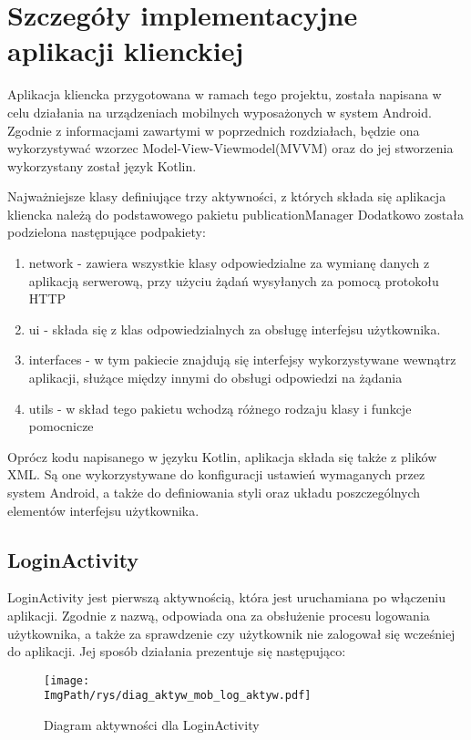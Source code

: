 \documentclass[a4paper,12pt,twoside,openany]{report}
\newcommand{\ImgPath}{.}
\begin{document}
\chapter{Szczegóły implementacyjne aplikacji klienckiej}

Aplikacja kliencka przygotowana w ramach tego projektu, została napisana w celu działania na urządzeniach mobilnych wyposażonych w system Android. Zgodnie z informacjami zawartymi w poprzednich rozdziałach, będzie ona wykorzystywać wzorzec Model-View-Viewmodel(MVVM) oraz do jej stworzenia wykorzystany został język Kotlin. 

Najważniejsze klasy definiujące trzy aktywności, z których składa się aplikacja kliencka należą do podstawowego pakietu publicationManager
Dodatkowo została podzielona następujące podpakiety:
\begin{enumerate}
 	\item network - zawiera wszystkie klasy odpowiedzialne za wymianę danych z aplikacją serwerową, przy użyciu żądań wysyłanych za pomocą protokołu HTTP
 	\item ui - składa się z klas odpowiedzialnych za obsługę interfejsu użytkownika.
 	\item interfaces - w tym pakiecie znajdują się interfejsy wykorzystywane wewnątrz aplikacji, służące między innymi do obsługi odpowiedzi na żądania
 	\item utils - w skład tego pakietu wchodzą różnego rodzaju klasy i funkcje pomocnicze
\end{enumerate}

Oprócz kodu napisanego w języku Kotlin, aplikacja składa się także z plików XML. Są one wykorzystywane do konfiguracji ustawień wymaganych przez system Android, a także do definiowania styli oraz układu poszczególnych elementów interfejsu użytkownika. 

\section{LoginActivity}
LoginActivity jest pierwszą aktywnością, która jest uruchamiana po włączeniu aplikacji. Zgodnie z nazwą, odpowiada ona za obsłużenie procesu logowania użytkownika, a także za sprawdzenie czy użytkownik nie zalogował się wcześniej do aplikacji. Jej sposób działania prezentuje się następująco: 
\begin{figure}[!htbp]
	\begin{center}
		\centering
		\texttt{[image: \\ImgPath/rys/diag\_aktyw\_mob\_log\_aktyw.pdf]}
	\end{center}
	\caption{Diagram aktywności dla LoginActivity}
	\label{diagramAktywnosciLoginActivity}
\end{figure}
\end{document}
